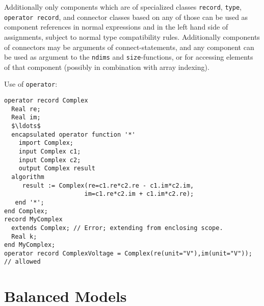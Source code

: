Additionally only components which are of specialized classes \lstinline!record!, \lstinline!type!, \lstinline!operator record!, and
connector classes based on any of those can be used as component references in normal expressions and in the left hand
side of assignments, subject to normal type compatibility rules.
Additionally components of connectors may be arguments of connect-statements,
and any component can be used as argument to the \lstinline!ndims! and \lstinline!size!-functions, or for accessing
elements of that component (possibly in combination with array indexing).

\begin{example}
Use of \lstinline!operator!:
\begin{lstlisting}[language=modelica]
operator record Complex
  Real re;
  Real im;
  $\ldots$
  encapsulated operator function '*'
    import Complex;
    input Complex c1;
    input Complex c2;
    output Complex result
  algorithm
     result := Complex(re=c1.re*c2.re - c1.im*c2.im,
                      im=c1.re*c2.im + c1.im*c2.re);
   end '*';
end Complex;
record MyComplex
  extends Complex; // Error; extending from enclosing scope.
  Real k;
end MyComplex;
operator record ComplexVoltage = Complex(re(unit="V"),im(unit="V")); // allowed
\end{lstlisting}
\end{example}

\section{Balanced Models}\label{balanced-models}

